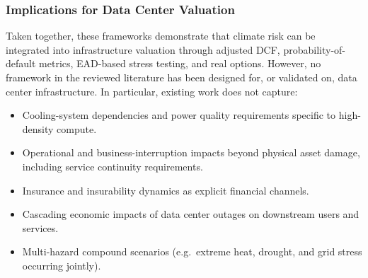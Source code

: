 \subsubsection{Implications for Data Center Valuation}

Taken together, these frameworks demonstrate that climate risk can be
integrated into infrastructure valuation through adjusted DCF, probability-of-default metrics, EAD-based stress testing, and real options. However, no
framework in the reviewed literature has been designed for, or validated on,
data center infrastructure. In particular, existing work does not capture:

\begin{itemize}
  \item Cooling-system dependencies and power quality requirements specific
        to high-density compute.
  \item Operational and business-interruption impacts beyond physical asset
        damage, including service continuity requirements.
  \item Insurance and insurability dynamics as explicit financial channels.
  \item Cascading economic impacts of data center outages on downstream
        users and services.
  \item Multi-hazard compound scenarios (e.g.\ extreme heat, drought, and
        grid stress occurring jointly).
\end{itemize}

